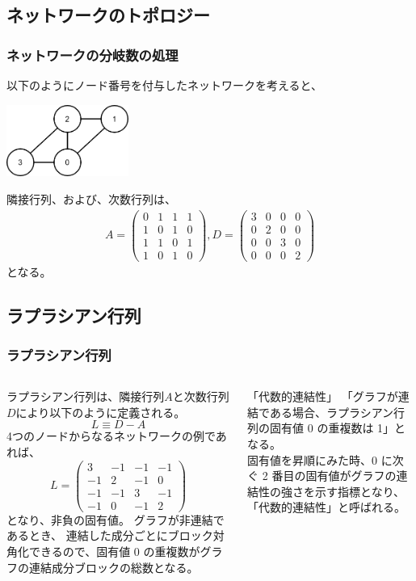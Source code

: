 \documentclass[aspectratio=169,11pt, dvipdfmx]{beamer}
\begin{document}
\subsection{ネットワークのトポロジー}
\begin{frame}
	\frametitle{ネットワークの分岐数の処理}
		以下のようにノード番号を付与したネットワークを考えると、
			\begin{center}
				\includegraphics[width=4cm]{NW-4.png}
			\end{center}
		隣接行列、および、次数行列は、
		\begin{align*}
			A = \left( 
			\begin{array}{cccc} 
			0 & 1 & 1 & 1 \\ 
			1 & 0 & 1 & 0 \\
			1 & 1 & 0 & 1 \\
			1 & 0 & 1 & 0 
			\end{array} 
			\right) 
			,
			D = \left( 
			\begin{array}{cccc} 
			3 & 0 & 0 & 0 \\ 
			0 & 2 & 0 & 0 \\
			0 & 0 & 3 & 0 \\
			0 & 0 & 0 & 2 
			\end{array} 
			\right) 
		\end{align*}
		となる。
\end{frame}

\subsection{ラプラシアン行列}
\begin{frame}
	\frametitle{ラプラシアン行列}
		\begin{columns}[totalwidth=1\textwidth]
				ラプラシアン行列は、隣接行列$A$と次数行列$D$により以下のように定義される。
				$$
				L \equiv D-A
				$$
				4つのノードからなるネットワークの例であれば、
				$$
				L = \left( 
				\begin{array}{cccc} 
				3 & -1 & -1 & -1 \\ 
				-1 &  2 & -1 & 0 \\
				-1 & -1 &  3 & -1 \\
				-1 &  0 & -1 & 2 
				\end{array} 
				\right) 
				$$
				となり、非負の固有値。
				グラフが非連結であるとき、%
				連結した成分ごとにブロック対角化できるので、固有値 0 の重複数がグラフの連結成分ブロックの総数となる。
				\begin{block}{「代数的連結性」}
					「グラフが連結である場合、ラプラシアン行列の固有値 0 の重複数は 1」となる。\\
					固有値を昇順にみた時、0 に次ぐ 2 番目の固有値がグラフの連結性の強さを示す指標となり、「代数的連結性」と呼ばれる。
				\end{block}
		\end{columns}
\end{frame}
\end{document}
